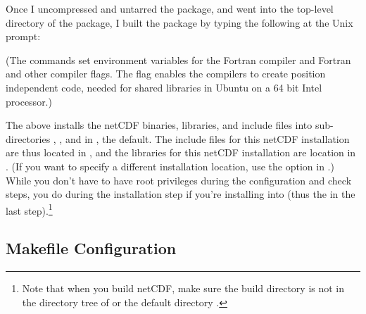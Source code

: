 Once I uncompressed and untarred the package, and went into
the top-level directory of the package, I built the package by typing
the following at the Unix prompt:

\begin{codeblock}
\end{codeblock}

(The  commands set environment variables for the
Fortran compiler and Fortran and other compiler flags.  The
 flag enables the compilers to create
position independent code, needed for shared libraries in
Ubuntu on a 64 bit Intel processor.)

The above installs the netCDF binaries, libraries, and include files into
sub-directories , , and  in 
, the default.
The include files for this netCDF installation are thus
located in , and the libraries for this
netCDF installation are location in .
(If you want to specify a different installation
location, use the  option in .)
While you don't have to have root privileges during the configuration
and check steps, you do during the installation step if you're installing
into  (thus the  in the last step).\footnote%
	{Note that when you build netCDF, make sure the build directory
	is not in the directory tree of 
	or the default directory .}





\subsection{Makefile Configuration}  \label{sec:ubuntu.makefile}

